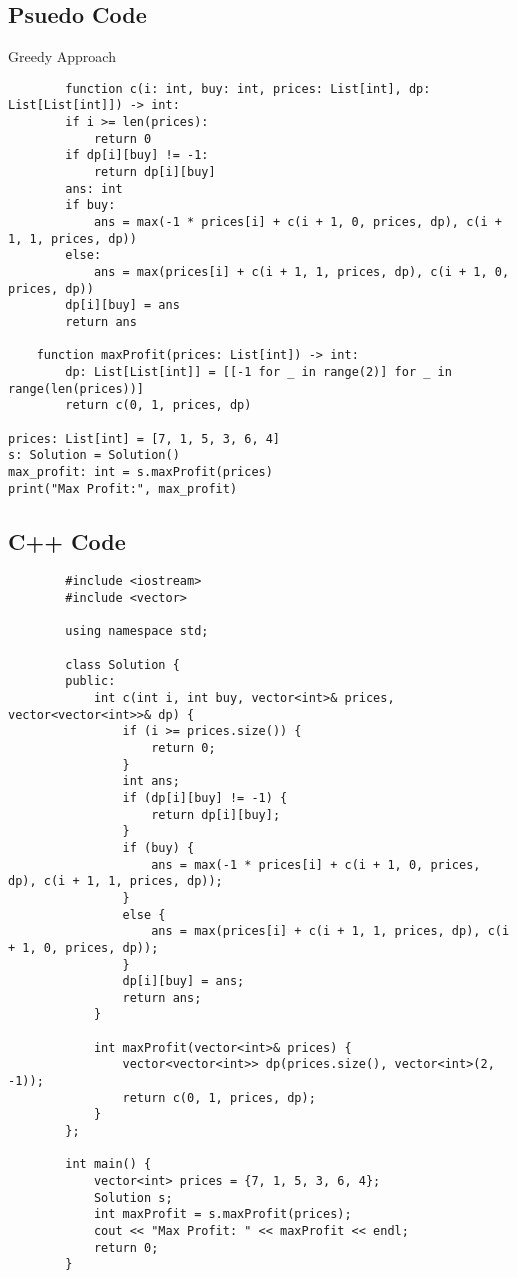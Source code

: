 \documentclass{article}
\begin{document}
     \newpage
     \subsection{Psuedo Code}{Greedy Approach}

     \begin{lstlisting}
        function c(i: int, buy: int, prices: List[int], dp: List[List[int]]) -> int:
        if i >= len(prices):
            return 0
        if dp[i][buy] != -1:
            return dp[i][buy]
        ans: int
        if buy:
            ans = max(-1 * prices[i] + c(i + 1, 0, prices, dp), c(i + 1, 1, prices, dp))
        else:
            ans = max(prices[i] + c(i + 1, 1, prices, dp), c(i + 1, 0, prices, dp))
        dp[i][buy] = ans
        return ans

    function maxProfit(prices: List[int]) -> int:
        dp: List[List[int]] = [[-1 for _ in range(2)] for _ in range(len(prices))]
        return c(0, 1, prices, dp)

prices: List[int] = [7, 1, 5, 3, 6, 4]
s: Solution = Solution()
max_profit: int = s.maxProfit(prices)
print("Max Profit:", max_profit)
       \end{lstlisting} 
    
    \newpage
    \subsection{C++ Code}
    \begin{lstlisting}
        #include <iostream>
        #include <vector>
        
        using namespace std;
        
        class Solution {
        public:
            int c(int i, int buy, vector<int>& prices, vector<vector<int>>& dp) {
                if (i >= prices.size()) {
                    return 0;
                }
                int ans;
                if (dp[i][buy] != -1) {
                    return dp[i][buy];
                }
                if (buy) {
                    ans = max(-1 * prices[i] + c(i + 1, 0, prices, dp), c(i + 1, 1, prices, dp));
                }
                else {
                    ans = max(prices[i] + c(i + 1, 1, prices, dp), c(i + 1, 0, prices, dp));
                }
                dp[i][buy] = ans;
                return ans;
            }
        
            int maxProfit(vector<int>& prices) {
                vector<vector<int>> dp(prices.size(), vector<int>(2, -1));
                return c(0, 1, prices, dp);
            }
        };
        
        int main() {
            vector<int> prices = {7, 1, 5, 3, 6, 4};
            Solution s;
            int maxProfit = s.maxProfit(prices);
            cout << "Max Profit: " << maxProfit << endl;
            return 0;
        }
    \end{lstlisting}
\end{document}
